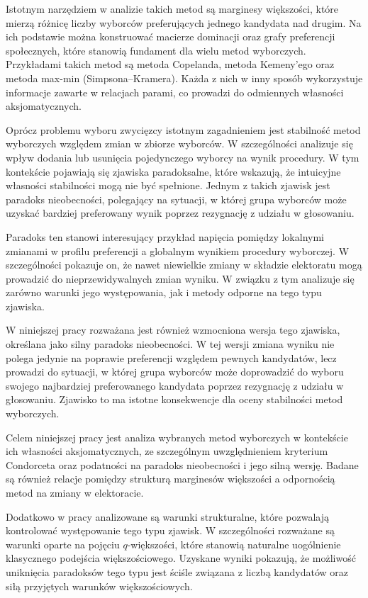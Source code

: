 \documentclass[12pt,a4paper]{mwrep}
\begin{document}
	Istotnym narzędziem w analizie takich metod są marginesy większości, które mierzą różnicę liczby wyborców preferujących jednego kandydata nad drugim. Na ich podstawie można konstruować macierze dominacji oraz grafy preferencji społecznych, które stanowią fundament dla wielu metod wyborczych. Przykładami takich metod są metoda Copelanda, metoda Kemeny’ego oraz metoda max-min (Simpsona–Kramera). Każda z nich w inny sposób wykorzystuje informacje zawarte w relacjach parami, co prowadzi do odmiennych własności aksjomatycznych.
	
	Oprócz problemu wyboru zwycięzcy istotnym zagadnieniem jest stabilność metod wyborczych względem zmian w zbiorze wyborców. W szczególności analizuje się wpływ dodania lub usunięcia pojedynczego wyborcy na wynik procedury. W tym kontekście pojawiają się zjawiska paradoksalne, które wskazują, że intuicyjne własności stabilności mogą nie być spełnione. Jednym z takich zjawisk jest paradoks nieobecności, polegający na sytuacji, w której grupa wyborców może uzyskać bardziej preferowany wynik poprzez rezygnację z udziału w głosowaniu.
	
	Paradoks ten stanowi interesujący przykład napięcia pomiędzy lokalnymi zmianami w profilu preferencji a globalnym wynikiem procedury wyborczej. W szczególności pokazuje on, że nawet niewielkie zmiany w składzie elektoratu mogą prowadzić do nieprzewidywalnych zmian wyniku. W związku z tym analizuje się zarówno warunki jego występowania, jak i metody odporne na tego typu zjawiska.
	
	W niniejszej pracy rozważana jest również wzmocniona wersja tego zjawiska, określana jako silny paradoks nieobecności. W tej wersji zmiana wyniku nie polega jedynie na poprawie preferencji względem pewnych kandydatów, lecz prowadzi do sytuacji, w której grupa wyborców może doprowadzić do wyboru swojego najbardziej preferowanego kandydata poprzez rezygnację z udziału w głosowaniu. Zjawisko to ma istotne konsekwencje dla oceny stabilności metod wyborczych.
	
	Celem niniejszej pracy jest analiza wybranych metod wyborczych w kontekście ich własności aksjomatycznych, ze szczególnym uwzględnieniem kryterium Condorceta oraz podatności na paradoks nieobecności i jego silną wersję. Badane są również relacje pomiędzy strukturą marginesów większości a odpornością metod na zmiany w elektoracie.
	
	Dodatkowo w pracy analizowane są warunki strukturalne, które pozwalają kontrolować występowanie tego typu zjawisk. W szczególności rozważane są warunki oparte na pojęciu \(q\)-większości, które stanowią naturalne uogólnienie klasycznego podejścia większościowego. Uzyskane wyniki pokazują, że możliwość uniknięcia paradoksów tego typu jest ściśle związana z liczbą kandydatów oraz siłą przyjętych warunków większościowych.
	
\end{document}
